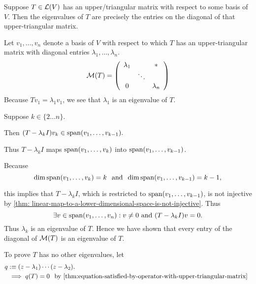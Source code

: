 \begin{thm}
  \label{thm:determination-of-eigenvalue-from-upper-triangular-matrix}
  Suppose $T\in \mathcal{L}(V)$ has an upper\-/triangular matrix with respect to some basis of $V$. Then the eigenvalues of $T$ are precisely the entries on the diagonal of that upper-triangular matrix. 

\end{thm}
\begin{prf}
  Let $v_1, \ldots, v_n$ denote a basis of $V$ with respect to which $T$ has an upper-triangular matrix with diagonal entries $\lambda_1, \ldots, \lambda_n$.
  \begin{equation}
    \mathcal{M}(T) =
    \left( {\begin{array}{ccc}
        \lambda_1 &         &  * \\
                  &  \ddots &    \\
           0      &         & \lambda_n
    \end{array} } \right)
  \end{equation}  
  Because $T v_1 = \lambda_1 v_1$, we see that $\lambda_1$ is an eigenvalue of $T$.
  
  Suppose $k \in \{2 \ldots n\}.$ 
  
  Then $(T-\lambda_k I) v_k \in \operatorname{span} (v_1, \ldots, v_{k-1}).$ 
  
  Thus $T-\lambda_k I$ maps $\operatorname{span} (v_1, \ldots, v_k)$ into $\operatorname{span} (v_1, \ldots, v_{k-1})$.
  
  Because
  \begin{equation}
    \dim \operatorname{span} (v_1, \ldots, v_k) = k \;\;\, \text{and}\;\; \dim \operatorname{span} (v_1, \ldots, v_{k-1}) = k-1,
  \end{equation}
  
  this implies that $T-\lambda_k I$, which is restricted to $\operatorname{span} (v_1, \ldots, v_{k-1})$, is not injective by \autoref{thm: linear-map-to-a-lower-dimensional-space-is-not-injective}. Thus 
  \begin{equation}
    \exists v \in \myspan{v_1, \ldots, v_n}: v\neq0$ and $(T-\lambda_k I)v=0. 
  \end{equation}
  Thus $\lambda_k$ is an eigenvalue of $T$. Hence we have shown that every entry of the diagonal of $\mathcal{M}(T)$ is an eigenvalue of $T$.
  
  To prove $T$ has no other eigenvalues, let
  \begin{equation}
    \begin{aligned}
      q &:\equiv (z-\lambda_1) \cdots (z-\lambda_2). \\
      &\implies q(T) = 0 \mytext{by \autoref{thm:equation-satisfied-by-operator-with-upper-triangular-matrix}}
    \end{aligned}
  \end{equation}
  

\end{prf}
